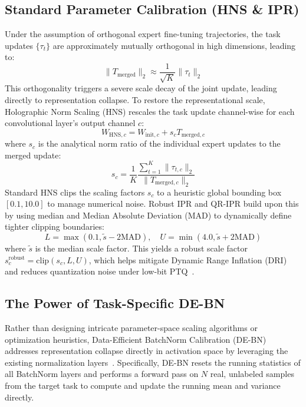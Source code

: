 \documentclass{article}
\begin{document}
\subsection{Standard Parameter Calibration (HNS \& IPR)}
Under the assumption of orthogonal expert fine-tuning trajectories, the task updates $\{\tau_t\}$ are approximately mutually orthogonal in high dimensions, leading to:
\begin{equation}
    \| T_{\text{merged}} \|_2 \approx \frac{1}{\sqrt{K}} \| \tau_t \|_2
\end{equation}
This orthogonality triggers a severe scale decay of the joint update, leading directly to representation collapse. To restore the representational scale, Holographic Norm Scaling (HNS) rescales the task update channel-wise for each convolutional layer's output channel $c$:
\begin{equation}
    W_{\text{HNS}, c} = W_{\text{init}, c} + s_c T_{\text{merged}, c}
\end{equation}
where $s_c$ is the analytical norm ratio of the individual expert updates to the merged update:
\begin{equation}
    s_c = \frac{1}{K} \frac{\sum_{t=1}^K \| \tau_{t, c} \|_2}{\| T_{\text{merged}, c} \|_2}
\end{equation}
Standard HNS clips the scaling factors $s_c$ to a heuristic global bounding box $[0.1, 10.0]$ to manage numerical noise. Robust IPR and QR-IPR build upon this by using median and Median Absolute Deviation (MAD) to dynamically define tighter clipping boundaries:
\begin{equation}
    L = \max(0.1, \tilde{s} - 2\text{MAD}), \quad U = \min(4.0, \tilde{s} + 2\text{MAD})
\end{equation}
where $\tilde{s}$ is the median scale factor. This yields a robust scale factor $s^{\text{robust}}_c = \text{clip}(s_c, L, U)$, which helps mitigate Dynamic Range Inflation (DRI) and reduces quantization noise under low-bit PTQ~\cite{submission5}.

\subsection{The Power of Task-Specific DE-BN}
Rather than designing intricate parameter-space scaling algorithms or optimization heuristics, Data-Efficient BatchNorm Calibration (DE-BN) addresses representation collapse directly in activation space by leveraging the existing normalization layers~\cite{submission10,ioffe2015batch}. Specifically, DE-BN resets the running statistics of all BatchNorm layers and performs a forward pass on $N$ real, unlabeled samples from the target task to compute and update the running mean and variance directly.
\end{document}
